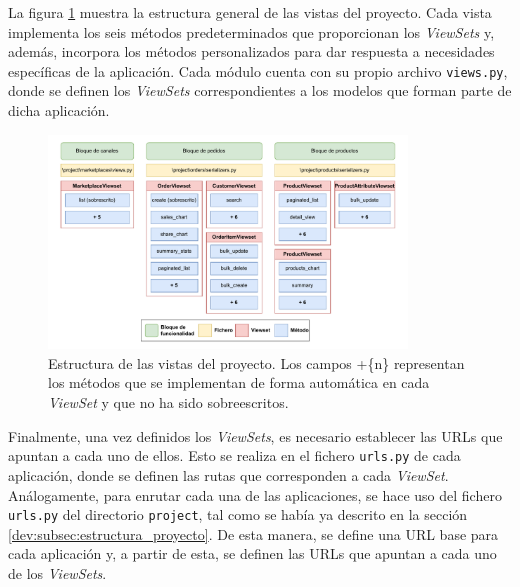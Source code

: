 La figura \ref{dev:fig:estructura_views} muestra la estructura general de las vistas del proyecto. Cada vista implementa los seis métodos predeterminados que proporcionan los \textit{ViewSets} y, además, incorpora los métodos personalizados para dar respuesta a necesidades específicas de la aplicación. Cada módulo cuenta con su propio archivo \texttt{views.py}, donde se definen los \textit{ViewSets} correspondientes a los modelos que forman parte de dicha aplicación.

\begin{figure}[H]
    \centering
    \includegraphics[width=0.85\textwidth]{figures/design_develop/estructura_views.pdf}
    \caption{Estructura de las vistas del proyecto. Los campos +\{n\} representan los métodos que se implementan de forma automática en cada \textit{ViewSet} y que no ha sido sobreescritos.}
    \label{dev:fig:estructura_views}
\end{figure}

Finalmente, una vez definidos los \textit{ViewSets}, es necesario establecer las URLs que apuntan a cada uno de ellos. Esto se realiza en el fichero \texttt{urls.py} de cada aplicación, donde se definen las rutas que corresponden a cada \textit{ViewSet}. Análogamente, para enrutar cada una de las aplicaciones, se hace uso del fichero \texttt{urls.py} del directorio \texttt{project}, tal como se había ya descrito en la sección \ref{dev:subsec:estructura_proyecto}. De esta manera, se define una URL base para cada aplicación y, a partir de esta, se definen las URLs que apuntan a cada uno de los \textit{ViewSets}.

